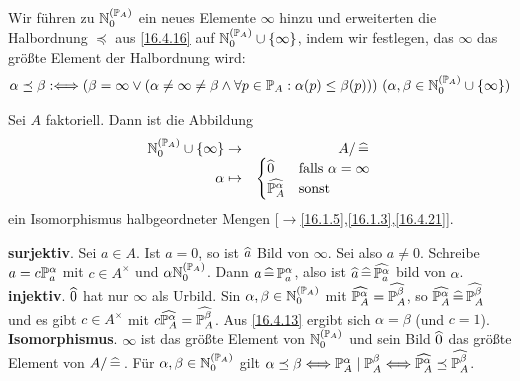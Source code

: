 \documentclass[../../main.tex]{subfiles}
\begin{document}
\begin{nt}\label{16.4.21}
Wir führen zu $\N_0^{(\P_A)}$ ein neues Elemente $\infty$ hinzu und erweiterten die Halbordnung $\preceq$ aus \ref{16.4.16} auf $\N_0^{(\P_A)}\cup\{\infty\}$, indem wir festlegen, das $\infty$ das größte Element der Halbordnung wird:
\begin{align*}
\alpha\preceq \beta:\Longleftrightarrow(\beta=\infty\lor(\alpha\neq\infty\neq\beta\land\forall p\in \P_A: \alpha(p)\le \beta(p)))\ (\alpha,\beta\in \N_0^{(\P_A)}\cup\{\infty\})
\end{align*}
\end{nt}

\begin{pro}\label{14.2.22}
Sei $A$ faktoriell. Dann ist die Abbildung
\begin{align*}
\begin{matrix*}[r]\N_0^{(\P_A)}\cup\{\infty\}\to& A/\divi\\ \alpha\mapsto&\begin{cases}\tc 0 & \text{falls }\alpha =\infty\\ \tc {\P_A^\alpha}&\text{sonst}\end{cases}\end{matrix*}
\end{align*}
ein Isomorphismus halbgeordneter Mengen [$\to$\ref{16.1.5},\ref{16.1.3},\ref{16.4.21}].
\end{pro}
\begin{cproof}
\textbf{surjektiv}. Sei $a\in A$. Ist $a=0$, so ist $\tc a$ Bild von $\infty$. Sei also $a\neq 0$. Schreibe $a=c\P_a^\alpha$ mit $c\in A^\times$ und $\alpha\N_0^{(\P_A)}$. Dann $a\divi \P_a^\alpha$, also ist $\tc a\divi \tc{\P_a^\alpha}$ bild von $\alpha$.\\

\noindent\textbf{injektiv}. $\tc 0$ hat nur $\infty$ als Urbild. Sin $\alpha,\beta\in \N_0^{(\P_A)}$ mit $\tc{\P_A^\alpha}=\tc{\P_A^\beta}$, so $\tc{\P_A^\alpha}\divi \tc{\P_A^\beta}$ und es gibt $c\in A^\times$ mit $c\tc{\P_A^\alpha}=\tc{\P_A^\beta}$. Aus \ref{16.4.13} ergibt sich $\alpha=\beta$ (und $c=1$).\\

\noindent\textbf{Isomorphismus}. $\infty$ ist das größte Element von $\N_0^{(\P_A)}$ und sein Bild $\tc 0$ das größte Element von $A/\divi$. Für $\alpha,\beta\in\N_0^{(\P_A)}$ gilt $\alpha\preceq \beta\Longleftrightarrow \P_A^\alpha\mid \P_A^\beta\Longleftrightarrow \tc{\P_A^\alpha}\preceq \tc{\P_A^\beta}$.
\end{cproof}
\end{document}
